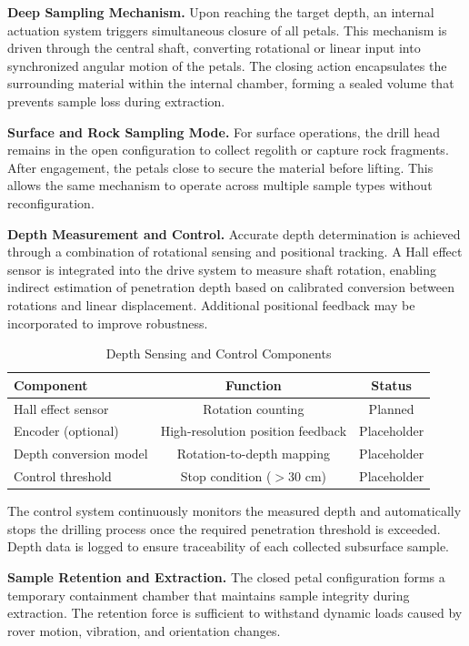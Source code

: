 \textbf{Deep Sampling Mechanism.} Upon reaching the target depth, an internal actuation system triggers simultaneous closure of all petals. This mechanism is driven through the central shaft, converting rotational or linear input into synchronized angular motion of the petals. The closing action encapsulates the surrounding material within the internal chamber, forming a sealed volume that prevents sample loss during extraction.

\textbf{Surface and Rock Sampling Mode.} For surface operations, the drill head remains in the open configuration to collect regolith or capture rock fragments. After engagement, the petals close to secure the material before lifting. This allows the same mechanism to operate across multiple sample types without reconfiguration.

\textbf{Depth Measurement and Control.} Accurate depth determination is achieved through a combination of rotational sensing and positional tracking. A Hall effect sensor is integrated into the drive system to measure shaft rotation, enabling indirect estimation of penetration depth based on calibrated conversion between rotations and linear displacement. Additional positional feedback may be incorporated to improve robustness.

\begin{table}[H]
\centering
\caption{Depth Sensing and Control Components}
\label{tab:depth_sensing}
\begin{tabular}{|l|c|c|}
\hline
Component & Function & Status \\
\hline
Hall effect sensor & Rotation counting & Planned \\
Encoder (optional) & High-resolution position feedback & Placeholder \\
Depth conversion model & Rotation-to-depth mapping & Placeholder \\
Control threshold & Stop condition ($>30$ cm) & Placeholder \\
\hline
\end{tabular}
\end{table}

The control system continuously monitors the measured depth and automatically stops the drilling process once the required penetration threshold is exceeded. Depth data is logged to ensure traceability of each collected subsurface sample.

\textbf{Sample Retention and Extraction.} The closed petal configuration forms a temporary containment chamber that maintains sample integrity during extraction. The retention force is sufficient to withstand dynamic loads caused by rover motion, vibration, and orientation changes.

